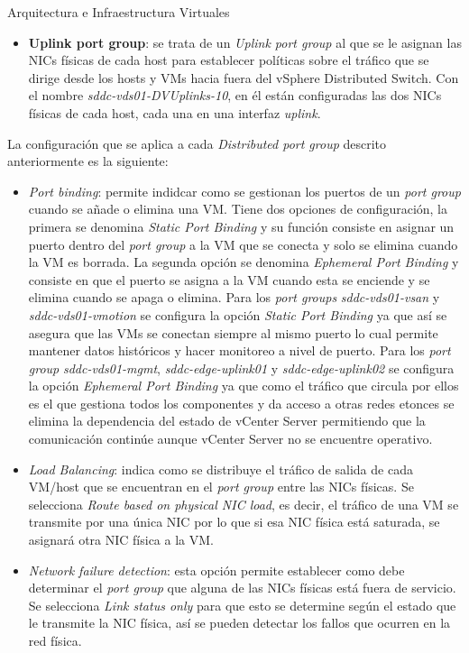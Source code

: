 \begin{subsection}{Arquitectura e Infraestructura Virtuales\cite{CFVirtInfraes}}
\begin{itemize}
        \item \textbf{Uplink port group}: se trata de un \textit{Uplink port group} al que se le asignan las NICs físicas de cada host para establecer políticas sobre el tráfico que se dirige desde los hosts y VMs hacia fuera del vSphere Distributed Switch. Con el nombre \textit{sddc-vds01-DVUplinks-10}, en él están configuradas las dos NICs físicas de cada host, cada una en una interfaz \textit{uplink}.
        
\end{itemize}
La configuración que se aplica a cada \textit{Distributed port group} descrito anteriormente es la siguiente:
\begin{itemize}
  \item \textit{Port binding}: permite indidcar como se gestionan los puertos de un \textit{port group} cuando se añade o elimina una VM. Tiene dos opciones de configuración, la primera se denomina \textit{Static Port Binding} y su función consiste en asignar un puerto dentro del \textit{port group} a la VM que se conecta y solo se elimina cuando la VM es borrada. La segunda opción se denomina \textit{Ephemeral Port Binding} y consiste en que el puerto se asigna a la VM cuando esta se enciende y se elimina cuando se apaga o elimina. Para los \textit{port groups} \textit{sddc-vds01-vsan} y \textit{sddc-vds01-vmotion} se configura la opción \textit{Static Port Binding} ya que así se asegura que las VMs se conectan siempre al mismo puerto lo cual permite mantener datos históricos y hacer monitoreo a nivel de puerto. Para los \textit{port group} \textit{sddc-vds01-mgmt}, \textit{sddc-edge-uplink01} y \textit{sddc-edge-uplink02} se configura la opción \textit{Ephemeral Port Binding} ya que como el tráfico que circula por ellos es el que gestiona todos los componentes y da acceso a otras redes etonces se elimina la dependencia del estado de vCenter Server permitiendo que la comunicación continúe aunque vCenter Server no se encuentre operativo.

  \item \textit{Load Balancing}: indica como se distribuye el tráfico de salida de cada VM/host que se encuentran en el \textit{port group} entre las NICs físicas. Se selecciona \textit{Route based on physical NIC load}, es decir, el tráfico de una VM se transmite por una única NIC por lo que si esa NIC física está saturada, se asignará otra NIC física a la VM.
  
  \item \textit{Network failure detection}: esta opción permite establecer como debe determinar el \textit{port group} que alguna de las NICs físicas está fuera de servicio. Se selecciona \textit{Link status only} para que esto se determine según el estado que le transmite la NIC física, así se pueden detectar los fallos que ocurren en la red física.
  

\end{itemize}
\end{subsection}
